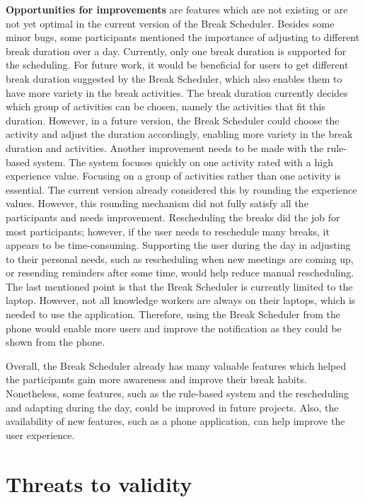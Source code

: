 \documentclass{hasel_thesis}
\begin{document}
\textbf{Opportunities for improvements} are features which are not existing or are not yet optimal in the current version of the Break Scheduler. Besides some minor bugs, some participants mentioned the importance of adjusting to different break duration over a day. Currently, only one break duration is supported for the scheduling. For future work, it would be beneficial for users to get different break duration suggested by the Break Scheduler, which also enables them to have more variety in the break activities. The break duration currently decides which group of activities can be chosen, namely the activities that fit this duration. However, in a future version, the Break Scheduler could choose the activity and adjust the duration accordingly, enabling more variety in the break duration and activities. Another improvement needs to be made with the rule-based system. The system focuses quickly on one activity rated with a high experience value. Focusing on a group of activities rather than one activity is essential. The current version already considered this by rounding the experience values. However, this rounding mechanism did not fully satisfy all the participants and needs improvement. Rescheduling the breaks did the job for most participants; however, if the user needs to reschedule many breaks, it appears to be time-consuming. Supporting the user during the day in adjusting to their personal needs, such as rescheduling when new meetings are coming up, or resending reminders after some time, would help reduce manual rescheduling. The last mentioned point is that the Break Scheduler is currently limited to the laptop. However, not all knowledge workers are always on their laptops, which is needed to use the application. Therefore, using the Break Scheduler from the phone would enable more users and improve the notification as they could be shown from the phone.

Overall, the Break Scheduler already has many valuable features which helped the participants gain more awareness and improve their break habits. Nonetheless, some features, such as the rule-based system and the rescheduling and adapting during the day, could be improved in future projects. Also, the availability of new features, such as a phone application, can help improve the user experience. 

\section{Threats to validity} \label{threats}
\end{document}
